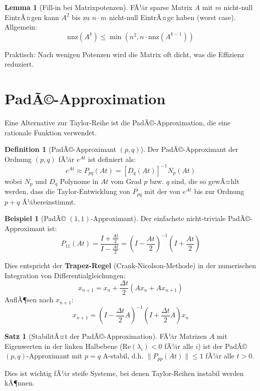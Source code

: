 ﻿\documentclass[a4paper,12pt]{report}
\theoremstyle{definition}
\newtheorem{definition}{Definition}
\newtheorem{beispiel}{Beispiel}
\newtheorem{satz}{Satz}
\newtheorem{lemma}{Lemma}
\begin{document}
	\begin{lemma}[Fill-in bei Matrixpotenzen]
		FÃ¼r sparse Matrix $A$ mit $m$ nicht-null EintrÃ¤gen kann $A^2$ bis zu $n \cdot m$ nicht-null EintrÃ¤ge haben (worst case). Allgemein:
		\[
		\text{nnz}(A^k) \leq \min(n^2, n \cdot \text{nnz}(A^{k-1}))
		\]
		
		Praktisch: Nach wenigen Potenzen wird die Matrix oft dicht, was die Effizienz reduziert.
	\end{lemma}
	
	\section{PadÃ©-Approximation}
	
	Eine Alternative zur Taylor-Reihe ist die PadÃ©-Approximation, die eine rationale Funktion verwendet.
	
	\begin{definition}[PadÃ©-Approximant $(p,q)$]
		Der PadÃ©-Approximant der Ordnung $(p,q)$ fÃ¼r $e^{At}$ ist definiert als:
		\[
		e^{At} \approx P_{pq}(At) = \left[ D_q(At) \right]^{-1} N_p(At)
		\]
		wobei $N_p$ und $D_q$ Polynome in $At$ vom Grad $p$ bzw. $q$ sind, die so gewÃ¤hlt werden, dass die Taylor-Entwicklung von $P_{pq}$ mit der von $e^{At}$ bis zur Ordnung $p+q$ Ã¼bereinstimmt.
	\end{definition}
	
	\begin{beispiel}[PadÃ© $(1,1)$-Approximant]
		Der einfachste nicht-triviale PadÃ©-Approximant ist:
		\[
		P_{11}(At) = \frac{I + \frac{At}{2}}{I - \frac{At}{2}} = \left(I - \frac{At}{2}\right)^{-1} \left(I + \frac{At}{2}\right)
		\]
		
		Dies entspricht der \textbf{Trapez-Regel} (Crank-Nicolson-Methode) in der numerischen Integration von Differentialgleichungen:
		\[
		x_{n+1} = x_n + \frac{\Delta t}{2}(Ax_n + Ax_{n+1})
		\]
		AuflÃ¶sen nach $x_{n+1}$:
		\[
		x_{n+1} = \left(I - \frac{\Delta t}{2} A\right)^{-1} \left(I + \frac{\Delta t}{2} A\right) x_n
		\]
	\end{beispiel}
	
	\begin{satz}[StabilitÃ¤t der PadÃ©-Approximation]
		FÃ¼r Matrizen $A$ mit Eigenwerten in der linken Halbebene ($\text{Re}(\lambda_i) < 0$ fÃ¼r alle $i$) ist der PadÃ© $(p,q)$-Approximant mit $p = q$ A-stabil, d.h. $\|P_{pp}(At)\| \leq 1$ fÃ¼r alle $t > 0$.
		
		Dies ist wichtig fÃ¼r steife Systeme, bei denen Taylor-Reihen instabil werden kÃ¶nnen.
	\end{satz}
	
\end{document}
